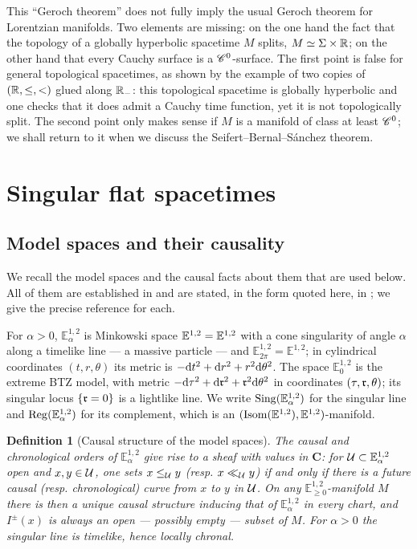 \documentclass[a4paper,twoside]{article}
\newcommand{\mass}[1]{\mathbb{E}^{1,2}_{#1}}
\newtheorem{defi}[lem]{Definition}
\begin{document}
This ``Geroch theorem'' does not fully imply the usual Geroch theorem for Lorentzian manifolds.
Two elements are missing: on the one hand the fact that the topology of a globally
hyperbolic spacetime $M$ splits, $M\simeq \Sigma\times \mathbb R$; on the other hand that every Cauchy surface
is a $\mathscr C^0$-surface.
The first point is false for general topological spacetimes, as shown by the example of
two copies of $(\mathbb R,\leq,<)$ glued along $\mathbb R_-$: this topological spacetime is globally hyperbolic
and one checks that it does admit a Cauchy time function, yet it is not topologically split.
The second point only makes sense if $M$ is a manifold of class at least $\mathscr C^0$; we shall return to it
when we discuss the Seifert--Bernal--S\'anchez theorem.

\section{Singular flat spacetimes}
\label{subsec:sing_spacetime_defi}

\subsection{Model spaces and their causality}
We recall the model spaces and the causal facts about them that are used below. All of them are
established in \cite{thesis,brunswic:hal-01317447} and are stated, in the form quoted here, in
\cite{brunswic2021cauchy}; we give the precise reference for each.

For $\alpha>0$, $\mass{\alpha}$ is Minkowski space $\mass{}=\E^{1,2}$ with a cone singularity of
angle $\alpha$ along a timelike line --- a massive particle --- and $\mass{2\pi}=\mass{}$; in
cylindrical coordinates $(t,r,\theta)$ its metric is $-\mathrm{d} t^2+\mathrm{d} r^2+r^2\mathrm{d} \theta^2$. The space
$\mass{0}$ is the extreme BTZ model, with metric $-\mathrm{d} \tau^2+\mathrm{d} \mathfrak{r}^2+\mathfrak{r}^2\mathrm{d} \theta^2$ in
coordinates $(\tau,\mathfrak{r},\theta)$; its singular locus $\{\mathfrak{r}=0\}$ is a lightlike line. We write
$\sing(\mass{\alpha})$ for the singular line and $\reg(\mass{\alpha})$ for its complement, which is
an $(\isom(\mass{}),\mass{})$-manifold.

\begin{defi}[Causal structure of the model spaces]\label{defi:causal_Ealpha}
The causal and chronological orders of $\mass{\alpha}$ give rise to a sheaf with values in
$\mathbf{C}$: for $\U\subset \mass{\alpha}$ open and $x,y\in \mathcal{U}$, one sets $x\leq_{\mathcal{U}} y$ (resp.
$x\ll_{\mathcal{U}} y$) if and only if there is a future causal (resp. chronological) curve from $x$ to $y$
in $\mathcal{U}$. On any $\mass{\geq0}$-manifold $M$ there is then a unique causal structure inducing that
of $\mass{\alpha}$ in every chart, and $I^\pm(x)$ is always an open --- possibly empty --- subset
of $M$. For $\alpha>0$ the singular line is timelike, hence locally chronal.
\end{defi}
\end{document}
